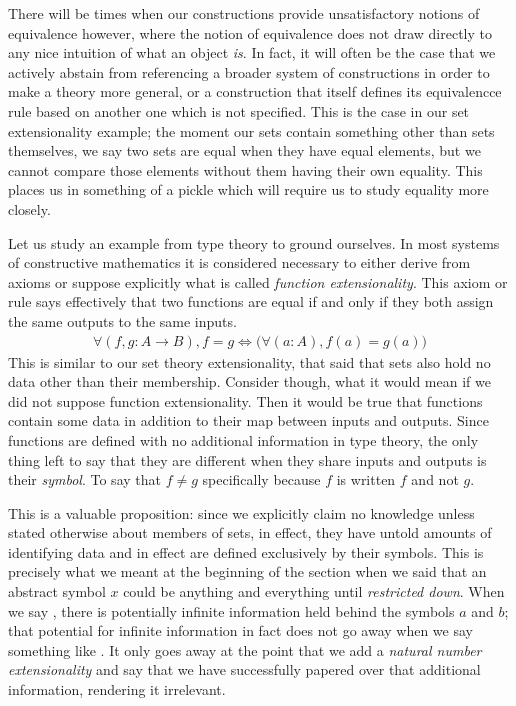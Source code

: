 \documentclass[11pt]{article}
\begin{document}
There will be times when our constructions provide unsatisfactory notions of equivalence however, where the notion of equivalence does not draw directly to any nice intuition of what an object \emph{is}. In fact, it will often be the case that we actively abstain from referencing a broader system of constructions in order to make a theory more general, or a construction that itself defines its equivalencce rule based on another one which is not specified. This is the case in our set extensionality example; the moment our sets contain something other than sets themselves, we say two sets are equal when they have equal elements, but we cannot compare those elements without them having their own equality. This places us in something of a pickle which will require us to study equality more closely.

Let us study an example from type theory to ground ourselves. In most systems of constructive mathematics it is considered necessary to either derive from axioms or suppose explicitly what is called \emph{function extensionality}. This axiom or rule says effectively that two functions are equal if and only if they both assign the same outputs to the same inputs. \begin{gather*}
\forall (f,g \colon A \to B), f = g \Leftrightarrow \big( \forall (a \colon A), f(a) = g(a) \big)
\end{gather*}
This is similar to our set theory extensionality, that said that sets also hold no data other than their membership. Consider though, what it would mean if we did not suppose function extensionality. Then it would be true that functions contain some data in addition to their map between inputs and outputs. Since functions are defined with no additional information in type theory, the only thing left to say that they are different when they share inputs and outputs is their \emph{symbol}. To say that $f \neq g$ specifically because $f$ is written $f$ and not $g$.

This is a valuable proposition: since we explicitly claim no knowledge unless stated otherwise about members of sets, in effect, they have untold amounts of identifying data and in effect are defined exclusively by their symbols. This is precisely what we meant at the beginning of the section when we said that an abstract symbol $x$ could be anything and everything until \emph{restricted down}. When we say , there is potentially infinite information held behind the symbols $a$ and $b$; that potential for infinite information in fact does not go away when we say something like . It only goes away at the point that we add a \emph{natural number extensionality} and say  that we have successfully papered over that additional information, rendering it irrelevant. 
\end{document}
